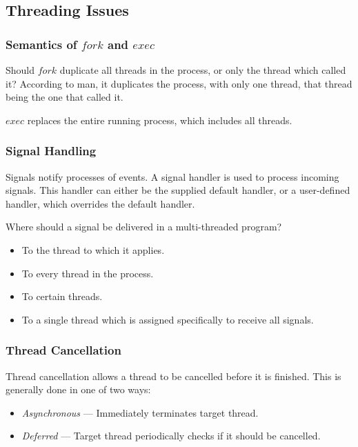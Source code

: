 \subsection{Threading Issues}

\subsubsection{Semantics of $fork$ and $exec$}

Should $fork$ duplicate all threads in the process,
or only the thread which called it? According to man, it duplicates the
process, with only one thread, that thread being the one that called it.

$exec$ replaces the entire running process, which includes all threads.


\subsubsection{Signal Handling}

Signals notify processes of events. A signal handler is used to process
incoming signals. This handler can either be the supplied default handler,
or a user-defined handler, which overrides the default handler.

Where should a signal be delivered in a multi-threaded program?

\begin{itemize}
    \item To the thread to which it applies.
    \item To every thread in the process.
    \item To certain threads.
    \item To a single thread which is assigned specifically to receive all signals.
\end{itemize}


\subsubsection{Thread Cancellation}

Thread cancellation allows a thread to be cancelled before it is finished.
This is generally done in one of two ways:
\begin{itemize}
    \item \textit{Asynchronous} --- Immediately terminates target thread.
    \item \textit{Deferred} --- Target thread periodically checks if it should be cancelled.
\end{itemize}


